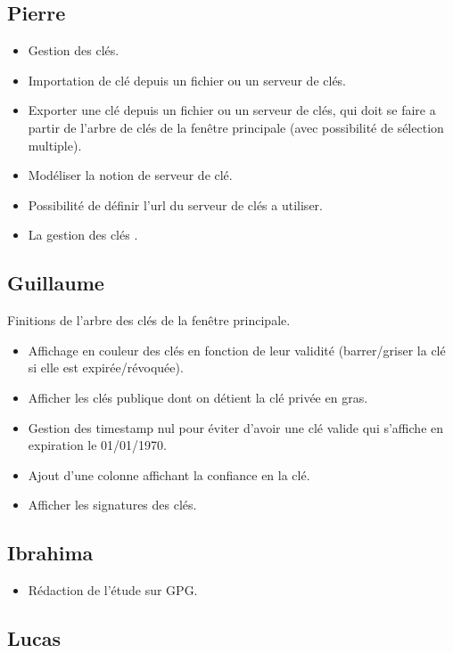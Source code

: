 \documentclass{../../res/CR-projet}
\begin{document}
\subsection{Pierre}

\begin{itemize}
  \item Gestion des clés.
  \item Importation de clé depuis un fichier ou un serveur de clés.
  \item Exporter une clé depuis un fichier ou un serveur de clés,
  qui doit se faire a partir de l'arbre de clés de la fenêtre principale
  (avec possibilité de sélection multiple).
  \item Modéliser la notion de serveur de clé.
  \item Possibilité de définir l'url du serveur de clés a utiliser.
  \item La gestion des clés .
\end{itemize}

\subsection{Guillaume}

Finitions de l'arbre des clés de la fenêtre principale.
\begin{itemize}
  \item Affichage en couleur des clés en fonction de leur validité
  (barrer/griser la clé si elle est expirée/révoquée).
  \item Afficher les clés publique dont on détient la clé privée en gras.
  \item Gestion des timestamp nul pour éviter d'avoir une clé valide qui s'affiche en expiration le 01/01/1970.
  \item Ajout d'une colonne affichant la confiance en la clé.
  \item Afficher les signatures des clés.
\end{itemize}

\subsection{Ibrahima}

\begin{itemize}
  \item Rédaction de l'étude sur GPG.
\end{itemize}

\subsection{Lucas}
\end{document}
